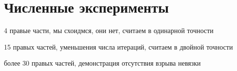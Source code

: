 \section{Численные эксперименты}
\label{sec:Chapter4} 

\par 4 правые части, мы схоидмся, они нет, считаем в одинарной точности
\par 15 правых частей, уменьшения числа итераций, считаем в двойной точности
\par более 30 правых частей, демонстрация отсутствия взрыва невязки

\newpage
